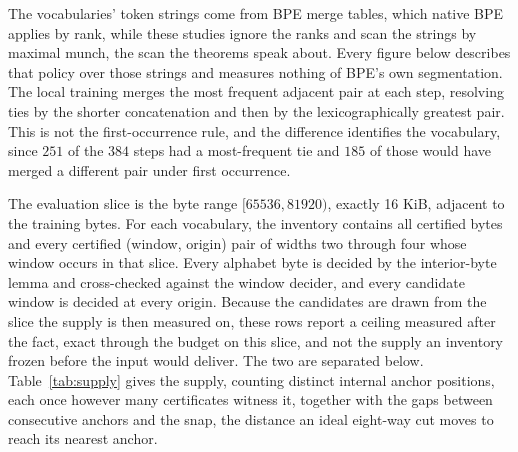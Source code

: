 \documentclass[11pt,a4paper]{article}
\theoremstyle{definition}
\theoremstyle{plain}
\newcommand{\code}[1]{\texttt{#1}}
\begin{document}
The vocabularies' token strings come from BPE merge tables, which native BPE applies by rank, while these studies ignore
the ranks and scan the strings by maximal munch, the scan the theorems speak about. Every figure below describes that
policy over those strings and measures nothing of BPE's own segmentation. The local training merges the most frequent
adjacent pair at each step, resolving ties by the shorter concatenation and then by the lexicographically greatest pair.
This is not the first-occurrence rule, and the difference identifies the vocabulary, since $251$ of the $384$ steps had
a most-frequent tie and $185$ of those would have merged a different pair under first occurrence.

The evaluation slice is the byte range $[65536, 81920)$, exactly 16 KiB, adjacent to the training bytes. For each
vocabulary, the inventory contains all certified bytes and every certified (window, origin) pair of widths two through
four whose window occurs in that slice. Every alphabet byte is decided by the interior-byte lemma and cross-checked
against the window decider, and every candidate window is decided at every origin. Because the candidates are drawn from
the slice the supply is then measured on, these rows report a ceiling measured after the fact, exact through the budget
on this slice, and not the supply an inventory frozen before the input would deliver. The two are separated below.
Table~\ref{tab:supply} gives the supply, counting distinct internal anchor positions, each once however many
certificates witness it, together with the gaps between consecutive anchors and the snap, the distance an ideal
eight-way cut moves to reach its nearest anchor.

\begin{table}[!htbp]
\centering

\caption{Certified-anchor supply of the two vocabularies on the evaluation slice, emitted by
\code{splitting\_measurements.py}. Gaps and snap distances are in bytes, and p50 and p90 denote the median and the
ninetieth percentile. The snap max (8) column gives the largest distance any of the seven ideal cuts of an eight-way
split moves to reach its nearest anchor. Gap statistics here are distances between consecutive anchor positions, so an
interior gap of $d$ bytes holds $d - 1$ anchor-free positions, and the runs before the first anchor and after the last
are excluded. The longest anchor-free stretch reported in the text also counts those runs.}
\label{tab:supply}
\end{table}
\FloatBarrier
\end{document}
